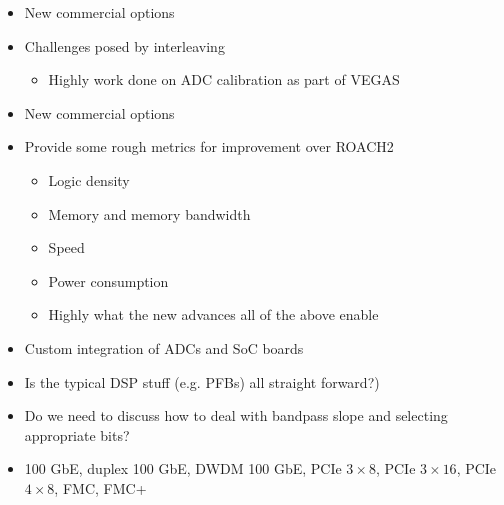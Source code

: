 \documentclass[10pt]{myNSF}
\begin{document}

\begin{itemize}
\item{New commercial options}
\item{Challenges posed by interleaving}
  \begin{itemize}
  \item{Highly work done on ADC calibration as part of VEGAS}
  \end{itemize}
\end{itemize}

\begin{itemize}
\item{New commercial options}
\item{Provide some rough metrics for improvement over ROACH2}
  \begin{itemize}
  \item{Logic density}
  \item{Memory and memory bandwidth}
  \item{Speed}
  \item{Power consumption}
  \item{Highly what the new advances all of the above enable}
  \end{itemize}
\item{Custom integration of ADCs and SoC boards}
\end{itemize}


\begin{itemize}
\item{Is the typical DSP stuff (e.g. PFBs) all straight forward?)}
\end{itemize}


\begin{itemize}
\item{Do we need to discuss how to deal with bandpass slope and
    selecting appropriate bits?}
\end{itemize}


\begin{itemize}
\item{100 GbE, duplex 100 GbE, DWDM 100 GbE, PCIe $3 \times 8$, PCIe
    $3 \times 16$, PCIe $4 \times 8$, FMC, FMC+}
\end{itemize}
\end{document}

